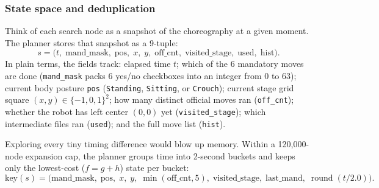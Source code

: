 \documentclass[11pt,a4paper]{article}
\newcommand{\code}[1]{\texttt{#1}}
\begin{document}
\subsubsection{State space and deduplication}
Think of each search node as a snapshot of the choreography at a given moment. The planner stores that snapshot as a 9-tuple:
\[
  s = \big(t,\; \text{mand\_mask},\; \text{pos},\; x,\; y,\; \text{off\_cnt},\; \text{visited\_stage},\; \text{used},\; \text{hist}\big).
\]
In plain terms, the fields track: elapsed time $t$; which of the 6 mandatory moves are done (\code{mand\_mask} packs 6 yes/no checkboxes into an integer from $0$ to $63$); current body posture \code{pos} (\code{Standing}, \code{Sitting}, or \code{Crouch}); current stage grid square $(x,y) \in \{-1,0,1\}^2$; how many distinct official moves ran (\code{off\_cnt}); whether the robot has left center $(0,0)$ yet (\code{visited\_stage}); which intermediate files ran (\code{used}); and the full move list (\code{hist}).

Exploring every tiny timing difference would blow up memory. Within a 120,000-node expansion cap, the planner groups time into 2-second buckets and keeps only the lowest-cost ($f = g + h$) state per bucket:
\[
  \text{key}(s) = \big(\text{mand\_mask},\; \text{pos},\; x,\; y,\; \min(\text{off\_cnt},5),\; \text{visited\_stage},\; \text{last\_mand},\; \operatorname{round}(t / 2.0)\big).
\]
\end{document}
